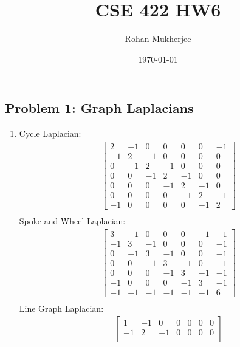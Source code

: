 \documentclass[12pt]{article}
\title{CSE 422 HW6}
\date{\today}
\author{Rohan Mukherjee}
\begin{document}
    \maketitle
    \subsection*{Problem 1: Graph Laplacians}
    \begin{enumerate}[leftmargin=\labelsep, label=(\alph*)]
        \item Cycle Laplacian:
        \begin{align*}
            &\begin{bmatrix}
            2 & -1 & 0 & 0 & 0 & 0 & -1 \\
            -1 & 2 & -1 & 0 & 0 & 0 & 0 \\
            0 & -1 & 2 & -1 & 0 & 0 & 0 \\
            0 & 0 & -1 & 2 & -1 & 0 & 0 \\
            0 & 0 & 0 & -1 & 2 & -1 & 0 \\
            0 & 0 & 0 & 0 & -1 & 2 & -1 \\
            -1 & 0 & 0 & 0 & 0 & -1 & 2
            \end{bmatrix} \\[1em]
        \end{align*}
        Spoke and Wheel Laplacian:
        \begin{align*}
            &\begin{bmatrix}
            3 & -1 & 0 & 0 & 0 & -1 & -1 \\
            -1 & 3 & -1 & 0 & 0 & 0 & -1 \\
            0 & -1 & 3 & -1 & 0 & 0 & -1 \\
            0 & 0 & -1 & 3 & -1 & 0 & -1 \\
            0 & 0 & 0 & -1 & 3 & -1 & -1 \\
            -1 & 0 & 0 & 0 & -1 & 3 & -1 \\
            -1 & -1 & -1 & -1 & -1 & -1 & 6
            \end{bmatrix} \\[1em]
        \end{align*}
        Line Graph Laplacian:
        \begin{align*}
            &\begin{bmatrix}
            1 & -1 & 0 & 0 & 0 & 0 & 0 \\
            -1 & 2 & -1 & 0 & 0 & 0 & 0 \\

\end{bmatrix}
\end{align*}
\end{enumerate}
\end{document}
